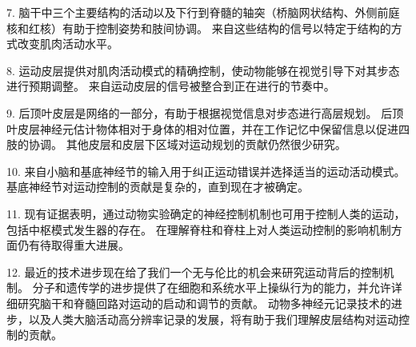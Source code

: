 7. 脑干中三个主要结构的活动以及下行到脊髓的轴突（桥脑网状结构、外侧前庭核和红核）有助于控制姿势和肢间协调。
来自这些结构的信号以特定于结构的方式改变肌肉活动水平。


8. 运动皮层提供对肌肉活动模式的精确控制，使动物能够在视觉引导下对其步态进行预期调整。
来自运动皮层的信号被整合到正在进行的节奏中。


9. 后顶叶皮层是网络的一部分，有助于根据视觉信息对步态进行高层规划。
后顶叶皮层神经元估计物体相对于身体的相对位置，并在工作记忆中保留信息以促进四肢的协调。
其他皮层和皮层下区域对运动规划的贡献仍然很少研究。


10. 来自小脑和基底神经节的输入用于纠正运动错误并选择适当的运动活动模式。
基底神经节对运动控制的贡献是复杂的，直到现在才被确定。


11. 现有证据表明，通过动物实验确定的神经控制机制也可用于控制人类的运动，包括中枢模式发生器的存在。
在理解脊柱和脊柱上对人类运动控制的影响机制方面仍有待取得重大进展。


12. 最近的技术进步现在给了我们一个无与伦比的机会来研究运动背后的控制机制。
分子和遗传学的进步提供了在细胞和系统水平上操纵行为的能力，并允许详细研究脑干和脊髓回路对运动的启动和调节的贡献。
动物多神经元记录技术的进步，以及人类大脑活动高分辨率记录的发展，将有助于我们理解皮层结构对运动控制的贡献。

